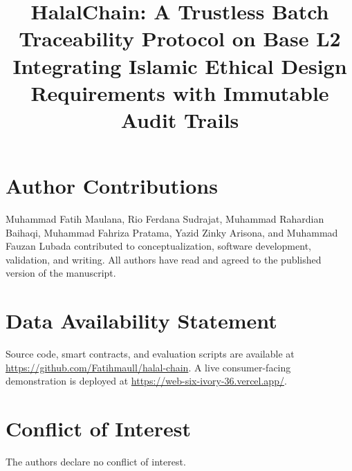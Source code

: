 \documentclass[journal]{IEEEtran}
\begin{document}
\title{HalalChain: A Trustless Batch Traceability Protocol on Base L2 Integrating Islamic Ethical Design Requirements with Immutable Audit Trails}

\author{%
}


\maketitle












\section*{Author Contributions}
Muhammad Fatih Maulana, Rio Ferdana Sudrajat, Muhammad Rahardian Baihaqi, Muhammad Fahriza Pratama, Yazid Zinky Arisona, and Muhammad Fauzan Lubada contributed to conceptualization, software development, validation, and writing.
All authors have read and agreed to the published version of the manuscript.

\section*{Data Availability Statement}
Source code, smart contracts, and evaluation scripts are available at \url{https://github.com/Fatihmaull/halal-chain}.
A live consumer-facing demonstration is deployed at \url{https://web-six-ivory-36.vercel.app/}.

\section*{Conflict of Interest}
The authors declare no conflict of interest.

\appendices




\end{document}
